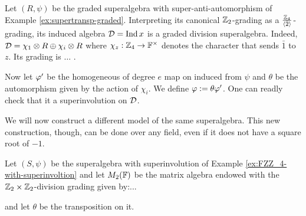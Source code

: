 \documentclass{amsbook}
\begin{document}
\begin{ex}
    Let $(R, \psi)$ be the graded superalgebra with super-anti-automorphism of Example \ref{ex:supertransp-graded}. Interpreting its canonical $\mathbb{Z}_2$-grading as a $\frac{\mathbb{Z}_4}{\langle \bar 2 \rangle}$-grading, its induced algebra $\mathcal{D} = \operatorname{Ind} x$ is a graded division superalgebra. Indeed, $\mathcal{D} = \chi_1 \otimes R \oplus \chi_i \otimes R$ where $\chi_z: \mathbb{Z}_4 \to \mathbb{F}^\times$ denotes the character that sends $\bar 1$ to $z$. Its grading is $\ldots$ .
    
    Now let $\varphi'$ be the homogeneous of degree $e$ map on induced from $\psi$ and $\theta$ be the automorphism given by the action of $\chi_i$. We define $\varphi := \theta \varphi'$. One can readly check that it a superinvolution on $\mathcal{D}$.
\end{ex}

We will now construct a different model of the same superalgebra. This new construction, though, can be done over any field, even if it does not have a square root of $-1$.


\begin{prop}
    Let $(S, \psi)$ be the superalgebra with superinvolution of Example \ref{ex:FZZ_4-with-superinvoltion} and let $M_2(\mathbb{F})$ be the matrix algebra endowed with the $\mathbb{Z}_2 \times \mathbb{Z}_2$-division grading given by:...
    
    and let $\theta$ be the transposition on it.
\end{prop}





\end{document}

